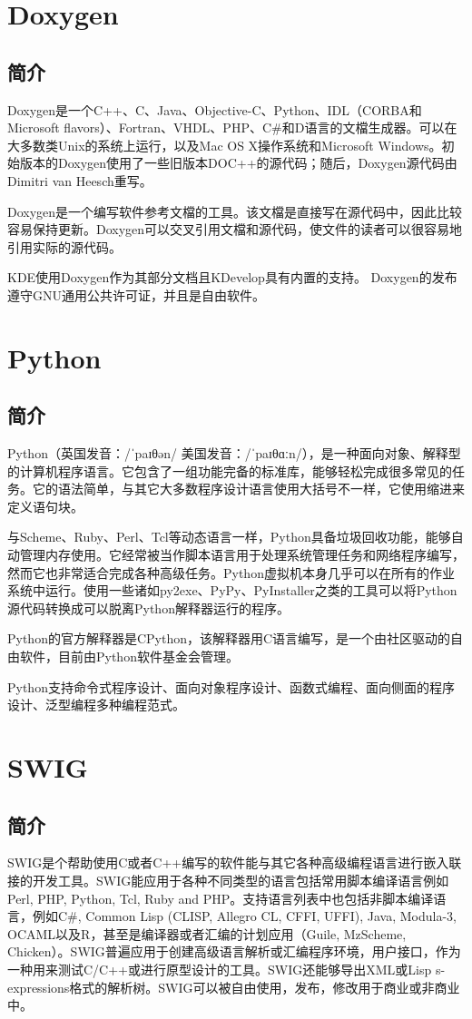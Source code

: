 \section{Doxygen}
	\subsection{简介}
	\par Doxygen是一个C++、C、Java、Objective-C、Python、IDL（CORBA和Microsoft flavors）、Fortran、VHDL、PHP、C\#和D语言的文檔生成器。可以在大多数类Unix的系统上运行，以及Mac OS X操作系统和Microsoft Windows。初始版本的Doxygen使用了一些旧版本DOC++的源代码；随后，Doxygen源代码由Dimitri van Heesch重写。
	\par Doxygen是一个编写软件参考文檔的工具。该文檔是直接写在源代码中，因此比较容易保持更新。Doxygen可以交叉引用文檔和源代码，使文件的读者可以很容易地引用实际的源代码。
	\par KDE使用Doxygen作为其部分文档且KDevelop具有内置的支持。 Doxygen的发布遵守GNU通用公共许可证，并且是自由软件。\cite{ wiki:Doxygen}
\section{Python}
	\subsection{简介}
	\par Python（英国发音：/ˈpaɪθən/ 美国发音：/ˈpaɪθɑːn/），是一种面向对象、解释型的计算机程序语言。它包含了一组功能完备的标准库，能够轻松完成很多常见的任务。它的语法简单，与其它大多数程序设计语言使用大括号不一样，它使用缩进来定义语句块。
	\par 与Scheme、Ruby、Perl、Tcl等动态语言一样，Python具备垃圾回收功能，能够自动管理内存使用。它经常被当作脚本语言用于处理系统管理任务和网络程序编写，然而它也非常适合完成各种高级任务。Python虚拟机本身几乎可以在所有的作业系统中运行。使用一些诸如py2exe、PyPy、PyInstaller之类的工具可以将Python源代码转换成可以脱离Python解释器运行的程序。
	\par Python的官方解释器是CPython，该解释器用C语言编写，是一个由社区驱动的自由软件，目前由Python软件基金会管理。
	\par Python支持命令式程序设计、面向对象程序设计、函数式编程、面向侧面的程序设计、泛型编程多种编程范式。\cite{ wiki:Python}
\section{SWIG}
	\subsection{简介}
	\par SWIG是个帮助使用C或者C++编写的软件能与其它各种高级编程语言进行嵌入联接的开发工具。SWIG能应用于各种不同类型的语言包括常用脚本编译语言例如Perl, PHP, Python, Tcl, Ruby and PHP。支持语言列表中也包括非脚本编译语言，例如C\#, Common Lisp (CLISP, Allegro CL, CFFI, UFFI), Java, Modula-3, OCAML以及R，甚至是编译器或者汇编的计划应用（Guile, MzScheme, Chicken）。SWIG普遍应用于创建高级语言解析或汇编程序环境，用户接口，作为一种用来测试C/C++或进行原型设计的工具。SWIG还能够导出XML或Lisp s-expressions格式的解析树。SWIG可以被自由使用，发布，修改用于商业或非商业中。\cite{ wiki:SWIG}
